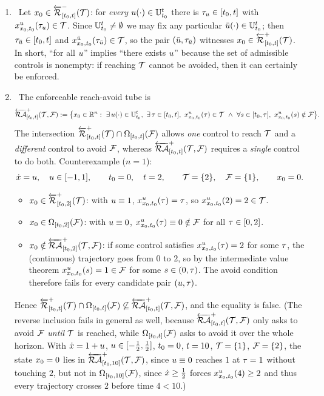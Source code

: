 \begin{enumerate}[label=(\alph*), itemsep=3pt]

\item \TRUE\
Let ${x}_0\in{\overleftarrow{{\mathcal{R}}}}^-_{[{t}_0,{t}]}({\mathcal{T}})$: for \emph{every} ${u}(\cdot)\in{\mathbb{U}}_{{t}_0}^{{t}}$ there is
${\tau}_{{u}}\in[{t}_0,{t}]$ with ${x}^{{u}}_{{x}_0,{t}_0}({\tau}_{{u}})\in{\mathcal{T}}$. Since
${\mathbb{U}}_{{t}_0}^{{t}}\neq\emptyset$ we may fix any particular $\bar{{u}}(\cdot)\in{\mathbb{U}}_{{t}_0}^{{t}}$; then
${\tau}_{\bar{{u}}}\in[{t}_0,{t}]$ and ${x}^{\bar{{u}}}_{{x}_0,{t}_0}({\tau}_{\bar{{u}}})\in{\mathcal{T}}$, so the
pair $(\bar{{u}},{\tau}_{\bar{{u}}})$ witnesses ${x}_0\in{\overleftarrow{{\mathcal{R}}}}^+_{[{t}_0,{t}]}({\mathcal{T}})$. In short,
``for all ${u}$'' implies ``there exists ${u}$'' because the set of admissible controls is
nonempty: if reaching ${\mathcal{T}}$ cannot be avoided, then it can certainly be enforced.

\item \FALSE\
The enforceable reach-avoid tube is
\[
\eRAT{\tvar} := \bigl\{\state_0\in\reals^n :\ \exists\,\ctrl(\cdot)\in\Usig,\ \exists\,\taux\in[\tvar_0,\tvar],\
\trju{\ctrl}{\taux}\in\target \ \wedge\ \forall s\in[\tvar_0,\taux],\ \trju{\ctrl}{s}\notin\failure\bigr\}.
\]
The intersection ${\overleftarrow{{\mathcal{R}}}}^+_{[{t}_0,{t}]}({\mathcal{T}})\cap{\Omega}_{[{t}_0,{t}]}({\mathcal{F}})$ allows \emph{one} control to
reach ${\mathcal{T}}$ and a \emph{different} control to avoid ${\mathcal{F}}$, whereas ${\overleftarrow{{\mathcal{RA}}}}^+_{[{t}_0,{t}]}({\mathcal{T}},{\mathcal{F}})$ requires
a \emph{single} control to do both. Counterexample ($n=1$):
\[
\dot{{x}}={u},\quad {u}\in[-1,1],\qquad {t}_0=0,\quad {t}=2,\qquad
{\mathcal{T}}=\{2\},\quad {\mathcal{F}}=\{1\},\qquad {x}_0=0.
\]
\begin{itemize}[itemsep=0pt]
\item ${x}_0\in{\overleftarrow{{\mathcal{R}}}}^+_{[{t}_0,2]}({\mathcal{T}})$: with ${u}\equiv1$, ${x}^{{u}}_{{x}_0,{t}_0}({\tau})={\tau}$, so
      ${x}^{{u}}_{{x}_0,{t}_0}(2)=2\in{\mathcal{T}}$.
\item ${x}_0\in{\Omega}_{[{t}_0,2]}({\mathcal{F}})$: with ${u}\equiv0$, ${x}^{{u}}_{{x}_0,{t}_0}({\tau})\equiv0\notin{\mathcal{F}}$
      for all ${\tau}\in[0,2]$.
\item ${x}_0\notin{\overleftarrow{{\mathcal{RA}}}}^+_{[{t}_0,2]}({\mathcal{T}},{\mathcal{F}})$: if some control satisfies ${x}^{{u}}_{{x}_0,{t}_0}({\tau})=2$ for some ${\tau}$,
      the (continuous) trajectory goes from $0$ to $2$, so by the intermediate value theorem
      ${x}^{{u}}_{{x}_0,{t}_0}(s)=1\in{\mathcal{F}}$ for some $s\in(0,{\tau})$. The avoid condition therefore fails
      for every candidate pair $({u},{\tau})$.
\end{itemize}
Hence ${\overleftarrow{{\mathcal{R}}}}^+_{[{t}_0,{t}]}({\mathcal{T}})\cap{\Omega}_{[{t}_0,{t}]}({\mathcal{F}})\not\subseteq{\overleftarrow{{\mathcal{RA}}}}^+_{[{t}_0,{t}]}({\mathcal{T}},{\mathcal{F}})$, and the equality
is false. (The reverse inclusion fails in general as well, because ${\overleftarrow{{\mathcal{RA}}}}^+_{[{t}_0,{t}]}({\mathcal{T}},{\mathcal{F}})$ only asks to avoid
${\mathcal{F}}$ \emph{until} ${\mathcal{T}}$ is reached, while ${\Omega}_{[{t}_0,{t}]}({\mathcal{F}})$ asks to avoid it over
the whole horizon. With $\dot{{x}}=1+{u}$, ${u}\in[-\tfrac12,\tfrac12]$, ${t}_0=0$, ${t}=10$,
${\mathcal{T}}=\{1\}$, ${\mathcal{F}}=\{2\}$, the state ${x}_0=0$ lies in ${\overleftarrow{{\mathcal{RA}}}}^+_{[{t}_0,10]}({\mathcal{T}},{\mathcal{F}})$, since ${u}\equiv0$
reaches $1$ at ${\tau}=1$ without touching $2$, but not in ${\Omega}_{[{t}_0,10]}({\mathcal{F}})$, since
$\dot{{x}}\ge\tfrac12$ forces ${x}^{{u}}_{{x}_0,{t}_0}(4)\ge2$ and thus every trajectory crosses $2$ before
time $4<10$.)


\end{enumerate}
